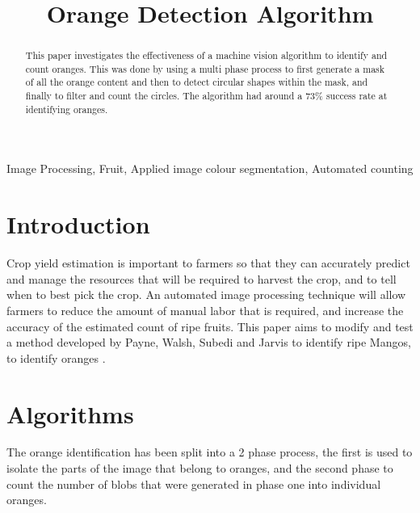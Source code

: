 \documentclass[conference]{IEEEtran}
\begin{document}
\title{Orange Detection Algorithm}

\author{
\and
{}
}

\maketitle

\begin{abstract}
This paper investigates the effectiveness of a machine vision algorithm to identify and count oranges. This was done by using a multi phase process to first generate a mask of all the orange content and then to detect circular shapes within the mask, and finally to filter and count the circles. The algorithm had around a 73\% success rate at identifying oranges.
\end{abstract}

\begin{IEEEkeywords}
Image Processing, Fruit, Applied image colour segmentation, Automated counting
\end{IEEEkeywords}

\section{Introduction}


Crop yield estimation is important to farmers so that they can accurately predict and manage the resources that will be required to harvest the crop, and to tell when to best pick the crop. An automated image processing technique will allow farmers to reduce the amount of manual labor that is required, and increase the accuracy of the estimated count of ripe fruits. This paper aims to modify and test a method developed by Payne, Walsh, Subedi and Jarvis to identify ripe Mangos, to identify oranges \cite{payne_estimation_2013}.


\section{Algorithms}

The orange identification has been split into a 2 phase process, the first is used to isolate the parts of the image that belong to oranges, and the second phase to count the number of blobs that were generated in phase one into individual oranges.
\end{document}
